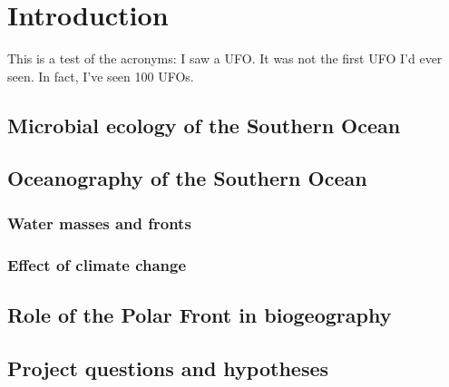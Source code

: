 \chapter{Introduction} 
\label{ch:intro}

This is a test of the acronyms: I saw a \ac{UFO}. It was not the first \ac{UFO} I'd ever seen. In fact, I've seen 100 \acp{UFO}.

\section{Microbial ecology of the Southern Ocean}

\section{Oceanography of the Southern Ocean}
\subsection{Water masses and fronts}
\subsection{Effect of climate change}

\section{Role of the Polar Front in biogeography}
\section{Project questions and hypotheses}
